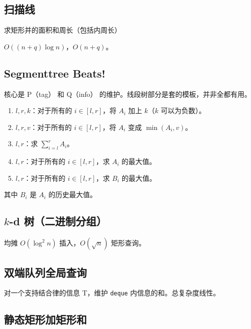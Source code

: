 \documentclass[12pt]{ctexart}
\begin{document}


\subsection{扫描线}

求矩形并的面积和周长（包括内周长）

$O((n+q)\log n)$，$O(n+q)$。



\subsection{Segmenttree Beats!}
核心是 P（tag） 和 Q（info） 的维护。线段树部分是套的模板，并非全都有用。
\begin{enumerate}
	\item $l,r,k$：对于所有的 $i\in[l,r]$，将 $A_i$ 加上 $k$（$k$ 可以为负数）。
	\item $l,r,v$：对于所有的 $i\in[l,r]$，将 $A_i$ 变成 $\min(A_i,v)$。
	\item $l,r$：求 $\sum\limits_{i=l}^{r}A_i$。
	\item $l,r$：对于所有的 $i\in[l,r]$，求 $A_i$ 的最大值。
	\item $l,r$：对于所有的 $i\in[l,r]$，求 $B_i$ 的最大值。
\end{enumerate}
其中 $B_i$ 是 $A_i$ 的历史最大值。


\subsection{$k$-d 树（二进制分组）}

均摊 $O(\log ^2n)$ 插入，$O(\sqrt n)$ 矩形查询。



\subsection{双端队列全局查询}

对一个支持结合律的信息 T，维护 \verb|deque| 内信息的和。总复杂度线性。



\subsection{静态矩形加矩形和}
\end{document}
